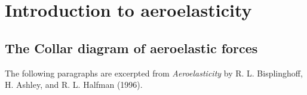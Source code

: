 \documentclass{AeroStructure-ERJohnson}
\begin{document}
\mainmatter

\setcounter{page}{331}

\setcounter{chapter}{11}

\chapter{Introduction to aeroelasticity}\label{ch12}

\section{The Collar diagram of aeroelastic forces}\label{sec12.1}

The following paragraphs are excerpted from \textit{Aeroelasticity} by R. L. Bisplinghoff, H. Ashley, and R. L. Halfman (1996).
\end{document}
